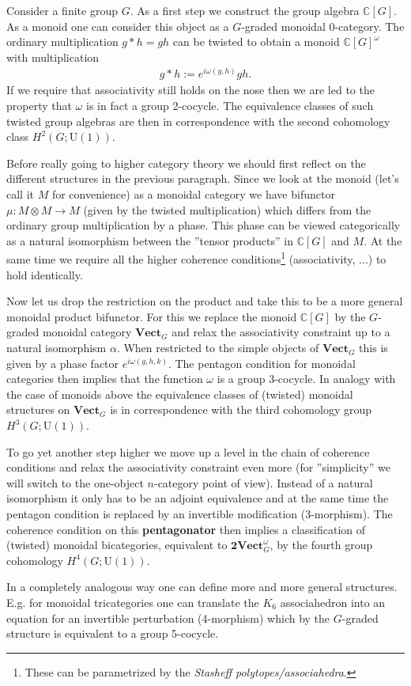     Consider a finite group $G$. As a first step we construct the group algebra $\mathbb{C}[G]$. As a monoid one can consider this object as a $G$-graded monoidal 0-category. The ordinary multiplication $g\ast h=gh$ can be twisted to obtain a monoid $\mathbb{C}[G]^\omega$ with multiplication
    \begin{gather}
        g\ast h := e^{i\omega(g, h)}gh.
    \end{gather}
    If we require that associativity still holds on the nose then we are led to the property that $\omega$ is in fact a group 2-cocycle. The equivalence classes of such twisted group algebras are then in correspondence with the second cohomology class $H^2(G; \text{U}(1))$.

    Before really going to higher category theory we should first reflect on the different structures in the previous paragraph. Since we look at the monoid (let's call it $M$ for convenience) as a monoidal category we have bifunctor $\mu:M\otimes M\rightarrow M$ (given by the twisted multiplication) which differs from the ordinary group multiplication by a phase. This phase can be viewed categorically as a natural isomorphism between the ''tensor products'' in $\mathbb{C}[G]$ and $M$. At the same time we require all the higher coherence conditions\footnote{These can be parametrized by the \textit{Stasheff polytopes/associahedra}.} (associativity, ...) to hold identically.

    Now let us drop the restriction on the product and take this to be a more general monoidal product bifunctor. For this we replace the monoid $\mathbb{C}[G]$ by the $G$-graded monoidal category $\mathbf{Vect}_G$ and relax the associativity constraint up to a natural isomorphism $\alpha$. When restricted to the simple objects of $\mathbf{Vect}_G$ this is given by a phase factor $e^{i\omega(g, h, k)}$. The pentagon condition for monoidal categories then implies that the function $\omega$ is a group 3-cocycle. In analogy with the case of monoids above the equivalence classes of (twisted) monoidal structures on $\mathbf{Vect}_G$ is in correspondence with the third cohomology group $H^3(G; \text{U}(1))$.

    To go yet another step higher we move up a level in the chain of coherence conditions and relax the associativity constraint even more (for ''simplicity'' we will switch to the one-object $n$-category point of view). Instead of a natural isomorphism it only has to be an adjoint equivalence and at the same time the pentagon condition is replaced by an invertible modification (3-morphism). The coherence condition on this \textbf{pentagonator} then implies a classification of (twisted) monoidal bicategories, equivalent to $\mathbf{2Vect}_G^\omega$, by the fourth group cohomology $H^4(G; \text{U}(1))$.

    In a completely analogous way one can define more and more general structures. E.g. for monoidal tricategories one can translate the $K_6$ associahedron into an equation for an invertible perturbation (4-morphism) which by the $G$-graded structure is equivalent to a group 5-cocycle.

